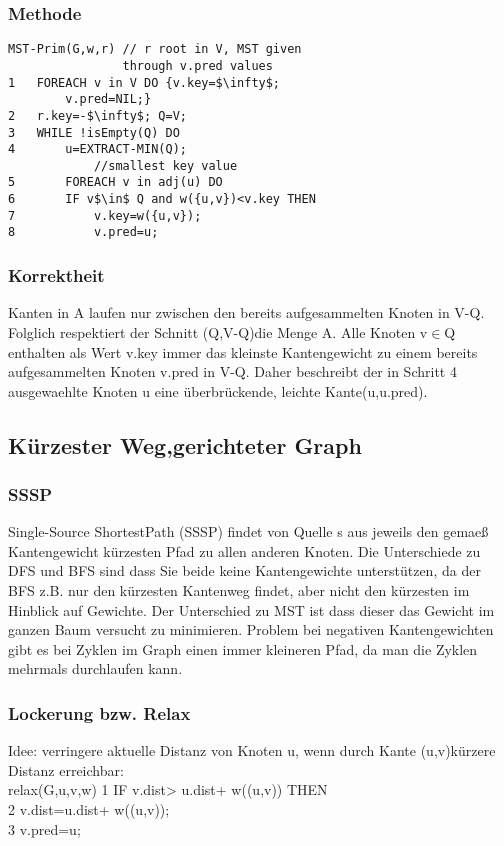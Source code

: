 \documentclass[jou,apacite]{apa6}
\begin{document}
\subsubsection{Methode}
\begin{lstlisting}[mathescape]
MST-Prim(G,w,r) // r root in V, MST given 
                through v.pred values
1   FOREACH v in V DO {v.key=$\infty$;
        v.pred=NIL;}
2   r.key=-$\infty$; Q=V;
3   WHILE !isEmpty(Q) DO
4       u=EXTRACT-MIN(Q);
            //smallest key value
5       FOREACH v in adj(u) DO
6       IF v$\in$ Q and w({u,v})<v.key THEN
7           v.key=w({u,v}); 
8           v.pred=u;
\end{lstlisting}

\subsubsection{Korrektheit}
Kanten in A laufen nur zwischen den bereits aufgesammelten Knoten in V-Q. Folglich respektiert der Schnitt (Q,V-Q)die Menge A. Alle Knoten v$\in$Q enthalten als Wert v.key immer das kleinste Kantengewicht zu einem bereits aufgesammelten Knoten v.pred in V-Q. Daher beschreibt der in Schritt 4 ausgewaehlte Knoten u eine überbrückende, leichte Kante(u,u.pred).

\subsection{Kürzester Weg,gerichteter Graph}
\subsubsection{SSSP}
Single-Source ShortestPath (SSSP) findet von Quelle s aus jeweils den gemaeß Kantengewicht kürzesten Pfad zu allen anderen Knoten. Die Unterschiede zu DFS und BFS sind dass Sie beide keine Kantengewichte unterstützen, da der BFS z.B. nur den kürzesten Kantenweg findet, aber nicht den kürzesten im Hinblick auf Gewichte. Der Unterschied zu MST ist dass dieser das Gewicht im ganzen Baum versucht zu minimieren. {Problem} bei negativen Kantengewichten gibt es bei Zyklen im Graph einen immer kleineren Pfad, da man die Zyklen mehrmals durchlaufen kann.

\subsubsection{Lockerung bzw. Relax}
Idee: verringere aktuelle Distanz von Knoten u, wenn durch Kante (u,v)kürzere Distanz erreichbar:\\
relax(G,u,v,w)
1   IF v.dist> u.dist+ w((u,v)) THEN\\
2   v.dist=u.dist+ w((u,v));\\
3   v.pred=u;\\
\end{document}
